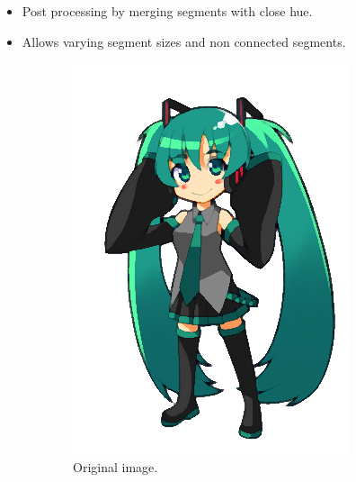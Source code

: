\documentclass{beamer}
\begin{document}
\begin{frame}
\end{frame}

\begin{frame}
\begin{itemize}
\item Post processing by merging segments with close hue.
\item Allows varying segment sizes and non connected segments.
\end{itemize}

\begin{figure}[htb!]
\centering
\begin{subfigure}{0.3\textwidth}
\includegraphics[width=\textwidth]{../images/miku_a.png}
\caption{Original image.}
\end{subfigure}
\begin{subfigure}{0.3\textwidth}

\end{subfigure}
\end{figure}
\end{frame}
\end{document}
